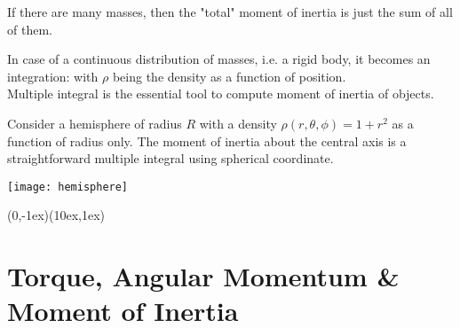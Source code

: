 \documentclass[class=article, crop=false, 12pt]{standalone}
\begin{document}
If there are many masses,
then the "total" moment of inertia is just the sum of all of them.

In case of a continuous distribution of masses, i.e. a rigid body,
it becomes an integration:
with $\rho$ being the density as a function of position.\\

Multiple integral is the essential tool to compute moment of inertia of objects.

\begin{example}
    Consider a hemisphere of radius $R$ with a density $\rho(r,\theta,\phi) = 1+r^2$ as a function of radius only.
    The moment of inertia about the central axis is a straightforward multiple integral using spherical coordinate. 
    
    \begin{center}
        \begin{minipage}{0.2\linewidth}
            \centering
            \texttt{[image: hemisphere]}
        \end{minipage}
    \end{center}

    {(0,-1ex)}{(10ex,1ex)}

\end{example}


\linesep
\newpage
\section{Torque, Angular Momentum \& Moment of Inertia}
\end{document}
